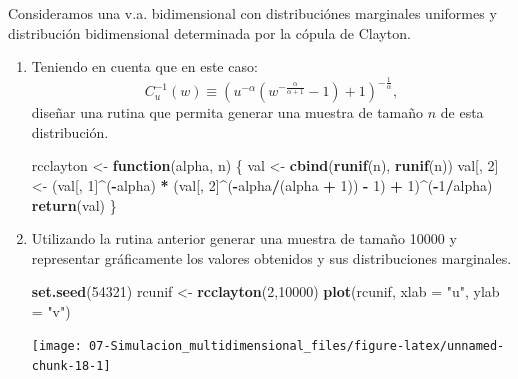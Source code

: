\documentclass[
]{book}
\newenvironment{Shaded}{\begin{snugshade}}{\end{snugshade}}
\newcommand{\ControlFlowTok}[1]{\textcolor[rgb]{0.13,0.29,0.53}{\textbf{#1}}}
\newcommand{\DataTypeTok}[1]{\textcolor[rgb]{0.13,0.29,0.53}{#1}}
\newcommand{\DecValTok}[1]{\textcolor[rgb]{0.00,0.00,0.81}{#1}}
\newcommand{\KeywordTok}[1]{\textcolor[rgb]{0.13,0.29,0.53}{\textbf{#1}}}
\newcommand{\NormalTok}[1]{#1}
\newcommand{\OperatorTok}[1]{\textcolor[rgb]{0.81,0.36,0.00}{\textbf{#1}}}
\newcommand{\StringTok}[1]{\textcolor[rgb]{0.31,0.60,0.02}{#1}}
\theoremstyle{break}
\theoremstyle{definition}
\theoremstyle{definition}
\theoremstyle{definition}
\theoremstyle{remark}
\begin{document}
Consideramos una v.a. bidimensional con distribuciónes marginales
uniformes y distribución bidimensional determinada por la cópula
de Clayton.

\begin{enumerate}
\def\labelenumi{\alph{enumi})}
\item
  Teniendo en cuenta que en este caso:
  \[C_{u}^{-1}(w)\equiv\left(  u^{-\alpha}\left(  
  w^{-\frac{\alpha}{\alpha+1}}-1\right) + 1 \right)^{-\frac{1}{\alpha}},\]
  diseñar una rutina que permita generar una muestra de tamaño \(n\)
  de esta distribución.

\begin{Shaded}
\begin{Highlighting}[]
\NormalTok{rcclayton <-}\StringTok{ }\ControlFlowTok{function}\NormalTok{(alpha, n) \{}
\NormalTok{  val <-}\StringTok{ }\KeywordTok{cbind}\NormalTok{(}\KeywordTok{runif}\NormalTok{(n), }\KeywordTok{runif}\NormalTok{(n))}
\NormalTok{  val[, }\DecValTok{2}\NormalTok{] <-}\StringTok{ }\NormalTok{(val[, }\DecValTok{1}\NormalTok{]}\OperatorTok{^}\NormalTok{(}\OperatorTok{-}\NormalTok{alpha) }\OperatorTok{*}\StringTok{ }
\StringTok{              }\NormalTok{(val[, }\DecValTok{2}\NormalTok{]}\OperatorTok{^}\NormalTok{(}\OperatorTok{-}\NormalTok{alpha}\OperatorTok{/}\NormalTok{(alpha }\OperatorTok{+}\StringTok{ }\DecValTok{1}\NormalTok{)) }\OperatorTok{-}\StringTok{ }\DecValTok{1}\NormalTok{) }\OperatorTok{+}\StringTok{ }\DecValTok{1}\NormalTok{)}\OperatorTok{^}\NormalTok{(}\OperatorTok{-}\DecValTok{1}\OperatorTok{/}\NormalTok{alpha)}
  \KeywordTok{return}\NormalTok{(val)}
\NormalTok{\}}
\end{Highlighting}
\end{Shaded}
\item
  Utilizando la rutina anterior generar una muestra de tamaño
  10000 y representar gráficamente los valores obtenidos y sus
  distribuciones marginales.

\begin{Shaded}
\begin{Highlighting}[]
\KeywordTok{set.seed}\NormalTok{(}\DecValTok{54321}\NormalTok{)}
\NormalTok{rcunif <-}\StringTok{ }\KeywordTok{rcclayton}\NormalTok{(}\DecValTok{2}\NormalTok{,}\DecValTok{10000}\NormalTok{)}
\KeywordTok{plot}\NormalTok{(rcunif, }\DataTypeTok{xlab =} \StringTok{"u"}\NormalTok{, }\DataTypeTok{ylab =} \StringTok{"v"}\NormalTok{)}
\end{Highlighting}
\end{Shaded}

  \begin{center}\texttt{[image: 07-Simulacion\_multidimensional\_files/figure-latex/unnamed-chunk-18-1]} \end{center}


\end{enumerate}
\end{document}
